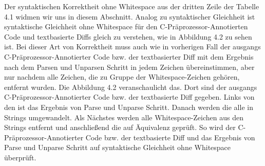 Der syntaktischen Korrektheit ohne Whitespace aus der dritten Zeile der Tabelle 4.1 widmen wir uns in diesem Abschnitt. Analog zu syntaktischer Gleichheit ist syntaktische Gleichheit ohne Whitespace für den C-Präprozessor-Annotierten Code und textbasierte Diffs gleich zu verstehen, wie in Abbildung 4.2 zu sehen ist. Bei dieser Art von Korrektheit muss auch wie in vorherigen Fall der ausgangs C-Präprozessor-Annotierter Code bzw. der textbasierter Diff mit dem Ergebnis nach dem Parsen und Unparsen Schritt in jedem Zeichen übereinstimmen, aber nur nachdem alle Zeichen, die zu Gruppe der Whitespace-Zeichen gehören, entfernt wurden. Die Abbildung 4.2 veranschaulicht das. Dort sind der ausgangs C-Präprozessor-Annotierter Code bzw. der textbasierte Diff gegeben. Links von den ist das Ergebnis von Parse und Unparse Schritt. Danach werden die alle in Strings umgewandelt. Als Nächstes werden alle Whitespace-Zeichen aus den Strings entfernt und anschließend die auf Äquivalenz geprüft. So wird der C-Präprozessor-Annotierter Code bzw. der textbasierte Diff und das Ergebnis von Parse und Unparse Schritt auf syntaktische Gleichheit ohne Whitespace überprüft.

